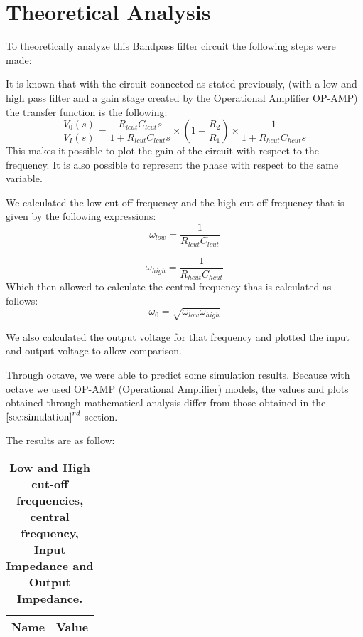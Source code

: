 
\section{Theoretical Analysis}
\label{sec:analysis}

To theoretically analyze this Bandpass filter circuit the following steps were made:
\par
\par
It is known that with the circuit connected as stated previously, (with a low and high pass filter and a gain stage created by the Operational Amplifier OP-AMP) the transfer function is the following:
\begin{equation}
    \dfrac{V_0(s)}{V_I(s)} = \dfrac{R_{lcut} C_{lcut} s}{1+R_{lcut} C_{lcut} s}\times \left( 1+\dfrac{R_2}{R_1} \right) \times \dfrac{1}{1+R_{hcut} C_{hcut} s}
\end{equation}
This makes it possible to plot the gain of the circuit with respect to the frequency. It is also possible to represent the phase with respect to the same variable.
\par
\par

We calculated the low cut-off frequency and the high cut-off frequency that is given by the following expressions:
\begin{equation}
    \omega_{low} = \dfrac{1}{R_{lcut} C_{lcut}}
\end{equation}

\begin{equation}
    \omega_{high} = \dfrac{1}{R_{hcut} C_{hcut}}
\end{equation}
Which then allowed to calculate the central frequency thas is calculated as follows:
\begin{equation}
    \omega_{0} = \sqrt{\omega_{low} \omega_{high}}
\end{equation}

We also calculated the output voltage for that frequency and plotted the input and output voltage to allow comparison.

Through octave, we were able to predict some simulation results. Because with octave we used OP-AMP (Operational Amplifier)  models, the values and plots obtained through mathematical analysis differ from those obtained in the $\ref{sec:simulation}^{rd}$ section.

The results are as follow:

\begin{table}[H]
\centering
\begin{tabular}{|l|l|}
\hline
{\bf Name} & {\bf Value} \\ \hline
    
\end{tabular}
\caption{\textbf{Low and High cut-off frequencies, central frequency, Input Impedance and Output Impedance.}}
\end{table}

